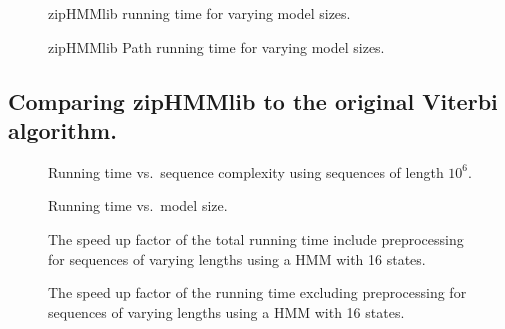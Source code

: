 \begin{figure}[H]
  \centering
  
  \caption{zipHMMlib running time for varying model sizes.}
  \label{fig:assymptotic_viterbi_k}
\end{figure}

\begin{figure}[H]
  \centering
  
  \caption{zipHMMlib Path running time for varying model sizes.}
  \label{fig:assymptotic_viterbi_path_k}
\end{figure}

%   

\subsection{Comparing zipHMMlib to the original Viterbi algorithm.}
\label{sec:comp-ziphmml-orig}

\begin{figure}[H]
  \centering
  
  \caption{Running time vs.\ sequence complexity using sequences of length $10^6$.}
  \label{fig:speedup_vs_complexity}
\end{figure}

\begin{figure}[H]
  \centering
  
  \caption{Running time vs.\ model size.}
  \label{fig:speedup_vs_k}
\end{figure}

\begin{figure}[H]
  \centering
  
  \caption{The speed up factor of the total running time include preprocessing
    for sequences of varying lengths using a HMM with 16 states.}
  \label{fig:speedup_vs_sequence_length}
\end{figure}

\begin{figure}[H]
  \centering
  
  \caption{The speed up factor of the running time excluding preprocessing for
    sequences of varying lengths using a HMM with 16 states.}
  \label{fig:speedup_vs_sequence_length2}
\end{figure}

